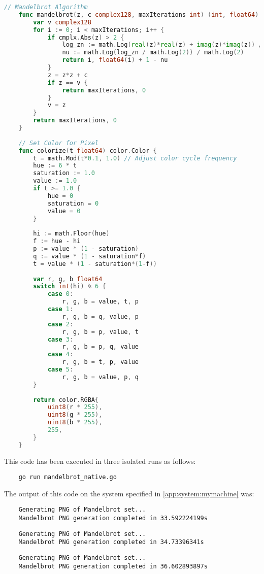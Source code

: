 \begin{lstlisting}[language=go, frame=tb, caption={Mandelbrot Set Calculation: Go}]
    // Mandelbrot Algorithm
    func mandelbrot(z, c complex128, maxIterations int) (int, float64) {
        var v complex128
        for i := 0; i < maxIterations; i++ {
            if cmplx.Abs(z) > 2 {
                log_zn := math.Log(real(z)*real(z) + imag(z)*imag(z)) / 2
                nu := math.Log(log_zn / math.Log(2)) / math.Log(2)
                return i, float64(i) + 1 - nu
            }
            z = z*z + c
            if z == v {
                return maxIterations, 0
            }
            v = z
        }
        return maxIterations, 0
    }
    
    // Set Color for Pixel
    func colorize(t float64) color.Color {
        t = math.Mod(t*0.1, 1.0) // Adjust color cycle frequency
        hue := 6 * t
        saturation := 1.0
        value := 1.0
        if t >= 1.0 {
            hue = 0
            saturation = 0
            value = 0
        }
    
        hi := math.Floor(hue)
        f := hue - hi
        p := value * (1 - saturation)
        q := value * (1 - saturation*f)
        t = value * (1 - saturation*(1-f))
    
        var r, g, b float64
        switch int(hi) % 6 {
            case 0:
                r, g, b = value, t, p
            case 1:
                r, g, b = q, value, p
            case 2:
                r, g, b = p, value, t
            case 3:
                r, g, b = p, q, value
            case 4:
                r, g, b = t, p, value
            case 5:
                r, g, b = value, p, q
        }
    
        return color.RGBA{
            uint8(r * 255),
            uint8(g * 255),
            uint8(b * 255),
            255,
        }
    }    
\end{lstlisting}

This code has been executed in three isolated runs as follows:
\begin{lstlisting}
    go run mandelbrot_native.go
\end{lstlisting}

The output of this code on the system specified in \ref{app:system:mymachine} was:
\begin{lstlisting}
    Generating PNG of Mandelbrot set... 
    Mandelbrot PNG generation completed in 33.592224199s
\end{lstlisting}
\begin{lstlisting}
    Generating PNG of Mandelbrot set... 
    Mandelbrot PNG generation completed in 34.73396341s
\end{lstlisting}
\begin{lstlisting}
    Generating PNG of Mandelbrot set... 
    Mandelbrot PNG generation completed in 36.602893897s
\end{lstlisting}

